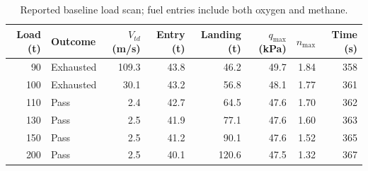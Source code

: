 \begin{table}[htbp]
\caption{Reported baseline load scan; fuel entries include both oxygen and methane.}
\label{tab:src2}
\small
\setlength{\tabcolsep}{3.5pt}
\begin{tabularx}{\linewidth}{@{}rlrrrrrr@{}}
\toprule
Load (t) & Outcome & $V_{td}$ (m/s) & Entry (t) & Landing (t) & $q_{\max}$ (kPa) & $n_{\max}$ & Time (s) \\
\midrule
90 & Exhausted & 109.3 & 43.8 & 46.2 & 49.7 & 1.84 & 358 \\
100 & Exhausted & 30.1 & 43.2 & 56.8 & 48.1 & 1.77 & 361 \\
110 & Pass & 2.4 & 42.7 & 64.5 & 47.6 & 1.70 & 362 \\
130 & Pass & 2.5 & 41.9 & 77.1 & 47.6 & 1.60 & 363 \\
150 & Pass & 2.5 & 41.2 & 90.1 & 47.6 & 1.52 & 365 \\
200 & Pass & 2.5 & 40.1 & 120.6 & 47.5 & 1.32 & 367 \\
\bottomrule
\end{tabularx}
\par{}
\end{table}
